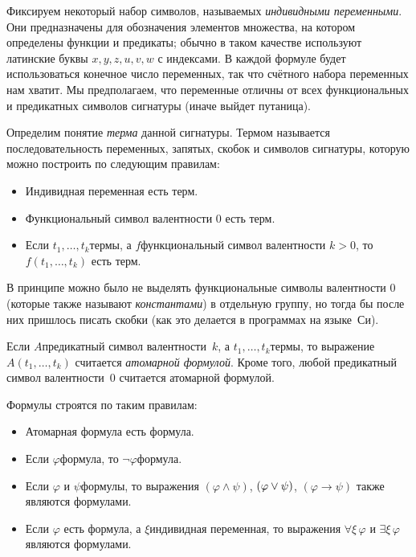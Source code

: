 Фиксируем некоторый набор символов, называемых \emph{индивидными
переменными}.%
%
Они предназначены для обозначения элементов
множества, на котором определены функции и предикаты; обычно
в таком качестве используют латинские буквы
$x,y,z,u,v,w$ с индексами. В каждой формуле будет использоваться
конечное число переменных, так что счётного набора переменных
нам хватит. Мы предполагаем, что переменные отличны от всех
функциональных и предикатных символов сигнатуры (иначе выйдет
путаница).

Определим понятие \emph{терма}%
данной сигнатуры. Термом называется
последовательность переменных, запятых, скобок и символов
сигнатуры, которую можно построить по следующим правилам:
\begin{itemize}
        \item
Индивидная переменная есть терм.
        \item
Функциональный символ валентности $0$ есть терм.
        \item
Если $t_1,\dots,t_k$\т термы, а $f$\т функциональный символ
валентности $k>0$, то $f(t_1,\dots,t_k)$ есть терм.
\end{itemize}

В принципе можно было не выделять функциональные символы
валентности $0$ (которые также называют \emph{константами})%
в отдельную группу, но тогда бы после них
пришлось писать скобки (как это делается в программах на
языке~Си).

Если $A$\т предикатный символ валентности~$k$, а
$t_1,\dots,t_k$\т термы, то выражение $A(t_1,\dots,t_k)$
считается \emph{атомарной формулой}.%
%
Кроме того, любой
предикатный символ валентности~$0$ считается атомарной формулой.

Формулы строятся по таким правилам:
\begin{itemize}
        \item
Атомарная формула есть формула.
        \item
Если $\varphi$\т формула, то $\lnot\varphi$\т формула.
        \item
Если $\varphi$ и $\psi$\т формулы, то выражения $(\varphi
\land\psi)$, $(\varphi\hm\lor\psi)$, $(\varphi\to\psi)$ также
являются формулами.
        \item
Если $\varphi$ есть формула, а $\xi$\т индивидная переменная, то
выражения $\forall \xi \,\varphi$ и $\exists \xi\,\varphi$
являются формулами.
\end{itemize}

